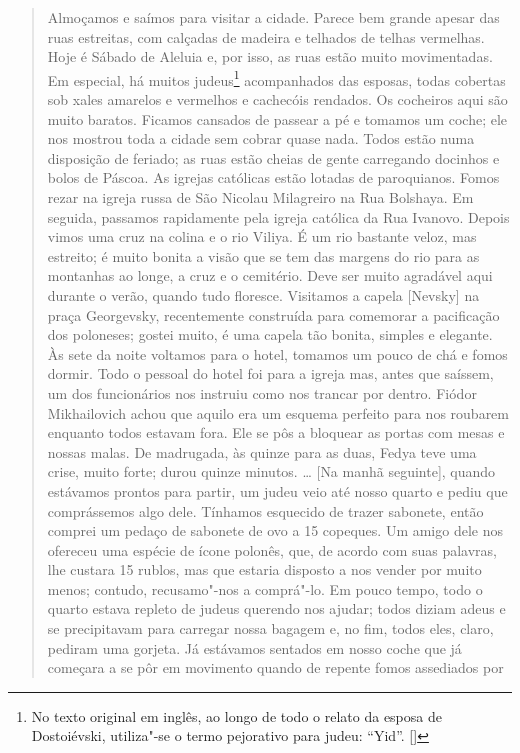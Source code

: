 \begin{quote}
Almoçamos e saímos para visitar a cidade. Parece bem grande apesar das
ruas estreitas, com calçadas de madeira e telhados de telhas vermelhas.
Hoje é Sábado de Aleluia e, por isso, as ruas estão muito movimentadas.
Em especial, há muitos judeus\footnote{No texto original em inglês,
  ao longo de todo o relato da esposa de Dostoiévski, utiliza"-se o termo
  pejorativo para judeu: ``Yid''. []} acompanhados das esposas, todas
cobertas sob xales amarelos e vermelhos e cachecóis rendados. Os
cocheiros aqui são muito baratos. Ficamos cansados de passear a pé e
tomamos um coche; ele nos mostrou toda a cidade sem cobrar quase nada.
Todos estão numa disposição de feriado; as ruas estão cheias de gente
carregando docinhos e bolos de Páscoa. As igrejas católicas estão
lotadas de paroquianos. Fomos rezar na igreja russa de São Nicolau
Milagreiro na Rua Bolshaya. Em seguida, passamos rapidamente pela igreja
católica da Rua Ivanovo. Depois vimos uma cruz na colina e o rio Viliya.
É um rio bastante veloz, mas estreito; é muito bonita a visão que se tem
das margens do rio para as montanhas ao longe, a cruz e o cemitério.
Deve ser muito agradável aqui durante o verão, quando tudo floresce.
Visitamos a capela {[}Nevsky{]} na praça Georgevsky, recentemente
construída para comemorar a pacificação dos poloneses; gostei muito, é
uma capela tão bonita, simples e elegante. Às sete da noite voltamos
para o hotel, tomamos um pouco de chá e fomos dormir. Todo o pessoal do
hotel foi para a igreja mas, antes que saíssem, um dos funcionários nos
instruiu como nos trancar por dentro. Fiódor Mikhailovich achou que
aquilo era um esquema perfeito para nos roubarem enquanto todos estavam
fora. Ele se pôs a bloquear as portas com mesas e nossas malas. De
madrugada, às quinze para as duas, Fedya teve uma crise, muito forte;
durou quinze minutos. \ldots{} {[}Na manhã seguinte{]}, quando estávamos
prontos para partir, um judeu veio até nosso quarto e pediu que
comprássemos algo dele. Tínhamos esquecido de trazer sabonete, então
comprei um pedaço de sabonete de ovo a 15 copeques. Um amigo dele nos
ofereceu uma espécie de ícone polonês, que, de acordo com suas palavras,
lhe custara 15 rublos, mas que estaria disposto a nos vender por muito
menos; contudo, recusamo"-nos a comprá"-lo. Em pouco tempo, todo o quarto
estava repleto de judeus querendo nos ajudar; todos diziam adeus e se
precipitavam para carregar nossa bagagem e, no fim, todos eles, claro,
pediram uma gorjeta. Já estávamos sentados em nosso coche que já
começara a se pôr em movimento quando de repente fomos assediados por

\end{quote}
